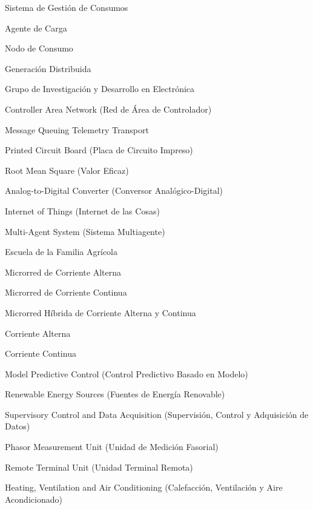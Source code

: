 
{Sistema de Gestión de Consumos}

{Agente de Carga}

{Nodo de Consumo}

{Generación Distribuida}

{Grupo de Investigación y Desarrollo en Electrónica}

{Controller Area Network (Red de Área de Controlador)}

{Message Queuing Telemetry Transport}

{Printed Circuit Board (Placa de Circuito Impreso)}

{Root Mean Square (Valor Eficaz)}

{Analog-to-Digital Converter (Conversor Analógico-Digital)}

{Internet of Things (Internet de las Cosas)}

{Multi-Agent System (Sistema Multiagente)}

{Escuela de la Familia Agrícola}

{Microrred de Corriente Alterna}

{Microrred de Corriente Continua}

{Microrred Híbrida de Corriente Alterna y Continua}

{Corriente Alterna}

{Corriente Continua}

{Model Predictive Control (Control Predictivo Basado en Modelo)}

{Renewable Energy Sources (Fuentes de Energía Renovable)}

{Supervisory Control and Data Acquisition (Supervisión, Control y Adquisición de Datos)}

{Phasor Measurement Unit (Unidad de Medición Fasorial)}

{Remote Terminal Unit (Unidad Terminal Remota)}

{Heating, Ventilation and Air Conditioning (Calefacción, Ventilación y Aire Acondicionado)}

